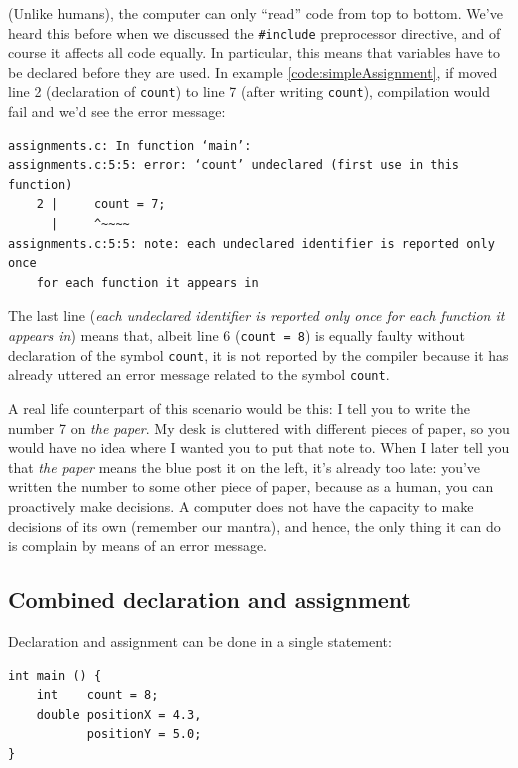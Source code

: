 \begin{hintbox}
(Unlike humans), the computer can only \enquote{read} code from top to bottom. We've heard this before when we discussed the \texttt{\#include} preprocessor directive, and of course it affects all code equally. In particular, this means that variables have to be declared before they are used. In example \ref{code:simpleAssignment}, if moved line 2 (declaration of \texttt{count}) to line 7 (after writing \texttt{count}), compilation would fail and we'd see the error message:

\begin{cmdbox}
\begin{verbatim}
assignments.c: In function ‘main’:
assignments.c:5:5: error: ‘count’ undeclared (first use in this function)
    2 |     count = 7;
      |     ^~~~~
assignments.c:5:5: note: each undeclared identifier is reported only once 
    for each function it appears in
\end{verbatim}
\end{cmdbox}

The last line (\emph{each undeclared identifier is reported only once for each function it appears in}) means that, albeit line 6 (\texttt{count = 8}) is equally faulty without declaration of the symbol \texttt{count}, it is not reported by the compiler because it has already uttered an error message related to the symbol \texttt{count}.

A real life counterpart of this scenario would be this: I tell you to write the number 7 on \emph{the paper}. My desk is cluttered with different pieces of paper, so you would have no idea where I wanted you to put that note to. When I later tell you that \emph{the paper} means the blue post it on the left, it's already too late: you've written the number to some other piece of paper, because as a human, you can proactively make decisions. A computer does not have the capacity to make decisions of its own (remember our mantra), and hence, the only thing it can do is complain by means of an error message.
\end{hintbox}


\subsection{Combined declaration and assignment} \label{sec:valueAssignment}
Declaration and assignment can be done in a single statement:
\begin{codebox}[combinedAssignments.c]
\begin{verbatim}
int main () {
    int    count = 8;
    double positionX = 4.3,
           positionY = 5.0;
}
\end{verbatim}
 \label{code:combinedAssignment}
\end{codebox}

